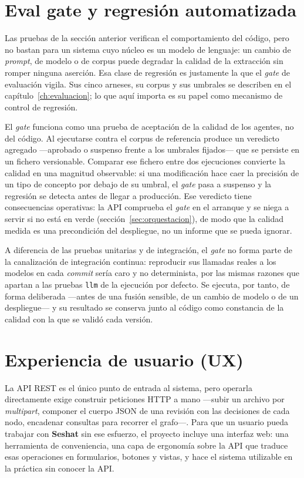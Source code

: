 \section{Eval gate y regresión automatizada}
\label{sec:eval-regresion}

Las pruebas de la sección anterior verifican el comportamiento del código, pero no bastan para un
sistema cuyo núcleo es un modelo de lenguaje: un cambio de \textit{prompt}, de modelo o de corpus
puede degradar la calidad de la extracción sin romper ninguna aserción. Esa clase de regresión es
justamente la que el \textit{gate} de evaluación vigila. Sus cinco arneses, su corpus y sus
umbrales se describen en el capítulo~\ref{ch:evaluacion}; lo que aquí importa es su papel como
mecanismo de control de regresión.

El \textit{gate} funciona como una prueba de aceptación de la calidad de los agentes, no del código.
Al ejecutarse contra el corpus de referencia produce un veredicto agregado —aprobado o suspenso
frente a los umbrales fijados— que se persiste en un fichero versionable. Comparar ese fichero entre
dos ejecuciones convierte la calidad en una magnitud observable: si una modificación hace caer la
precisión de un tipo de concepto por debajo de su umbral, el \textit{gate} pasa a suspenso y la
regresión se detecta antes de llegar a producción. Ese veredicto tiene consecuencias operativas: la
\ac{API} comprueba el \textit{gate} en el arranque y se niega a servir si no está en verde
(sección~\ref{sec:orquestacion}), de modo que la calidad medida es una precondición del despliegue,
no un informe que se pueda ignorar.

A diferencia de las pruebas unitarias y de integración, el \textit{gate} no forma parte de la
canalización de integración continua: reproducir sus llamadas reales a los modelos en cada
\textit{commit} sería caro y no determinista, por las mismas razones que apartan a las pruebas
\texttt{llm} de la ejecución por defecto. Se ejecuta, por tanto, de forma deliberada —antes de una
fusión sensible, de un cambio de modelo o de un despliegue— y su resultado se conserva junto al
código como constancia de la calidad con la que se validó cada versión.

\section{Experiencia de usuario (UX)}
\label{sec:ux}

La \ac{API} REST es el único punto de entrada al sistema, pero operarla directamente exige construir
peticiones HTTP a mano —subir un archivo por \textit{multipart}, componer el cuerpo JSON de una
revisión con las decisiones de cada nodo, encadenar consultas para recorrer el grafo—. Para que un
usuario pueda trabajar con \textbf{Seshat} sin ese esfuerzo, el proyecto incluye una interfaz web:
una herramienta de conveniencia, una capa de ergonomía sobre la \ac{API} que traduce esas operaciones en
formularios, botones y vistas, y hace el sistema utilizable en la práctica sin conocer la \ac{API}.

